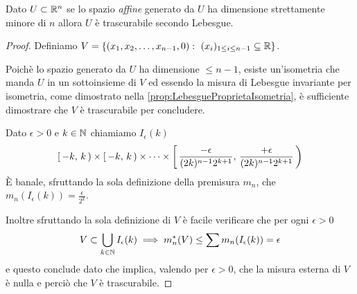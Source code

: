 \begin{proposition}\label{prop:SottospaziTrascurabili}
	Dato $U\subset\mathbb R^n$ se lo spazio \emph{affine} generato da $U$ ha dimensione strettamente minore di $n$ allora $U$ è trascurabile secondo Lebesgue.
\end{proposition}
\begin{proof}
	Definiamo $V=\{(x_1,x_2,\dots,x_{n-1},0):\ (x_i)_{1\le i\le n-1}\subseteq\mathbb R\}$.
	
	Poichè lo spazio generato da $U$ ha dimensione $\le n-1$, esiste un'isometria che manda $U$ in un sottoinsieme di $V$ ed essendo la misura di Lebesgue invariante per isometria, come dimostrato nella \cref{prop:LebesgueProprietaIsometria}, è sufficiente dimostrare che $V$ è trascurabile per concludere.
	
	Dato $\epsilon>0$ e $k\in\mathbb N$ chiamiamo $I_\epsilon(k)$
	\begin{equation*}
		\left[\,-k,\,k\,\right)\times\left[\,-k,\,k\,\right)\times\cdots\times \left[\,\frac{-\epsilon}{(2k)^{n-1}2^{k+1}},\,\frac{+\epsilon}{(2k)^{n-1}2^{k+1}}\,\right)
	\end{equation*}
	È banale, sfruttando la sola definizione della premisura $m_n$, che $m_n(I_\epsilon(k))=\frac{\epsilon}{2^k}$.
	
	Inoltre sfruttando la sola definizione di $V$ è facile verificare che per ogni $\epsilon>0$
	\begin{equation*}
		V\subset\bigcup_{k\in\mathbb N} I_\epsilon(k)\implies m_n^*(V)\le \sum m_n(I_\epsilon(k))=\epsilon
	\end{equation*}
	e questo conclude dato che implica, valendo per $\epsilon>0$, che la misura esterna di $V$ è nulla e perciò che $V$ è trascurabile.
\end{proof}

